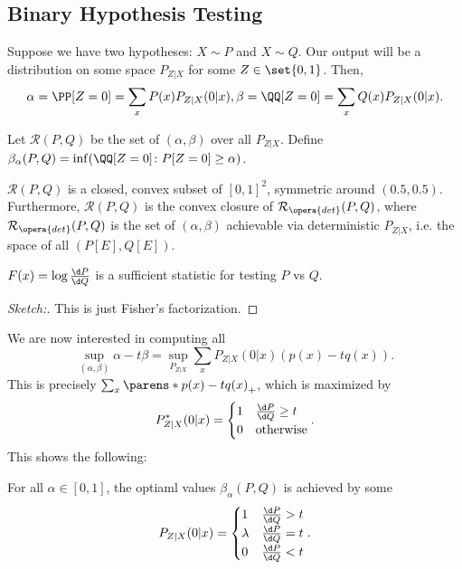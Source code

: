 \subsection{Binary Hypothesis Testing}

Suppose we have two hypotheses: $X\sim P$ and $X\sim Q$. Our output will be a distribution on some space $P_{Z|X}$ for some $Z\in \set{0,1}$.
Then, \[
	\alpha = \PP[Z=0] = \sum_x P(x) P_{Z|X}(0|x), \beta = \QQ[Z=0] = \sum_x Q(x) P_{Z|X}(0|x).
\]
\begin{defn}
	Let $\mathcal R(P,Q)$ be the set of $(\alpha, \beta)$ over all $P_{Z|X}$. Define $\beta_\alpha(P,Q) = \inf (\QQ[Z=0] \colon P[Z=0] \geq \alpha)$.
\end{defn}

\begin{fact}
	$\mathcal R(P,Q)$ is a closed, convex subset of $[0,1]^2$, symmetric around $(0.5, 0.5)$. Furthermore, $\mathcal R(P,Q)$ is the convex closure of $\mathcal R_{\opera{det}}(P,Q)$, where $\mathcal R_{\opera{det}}(P,Q)$ is the set of $(\alpha, \beta)$ achievable via deterministic $P_{Z|X}$, i.e. the space of all $(P[E], Q[E])$.
\end{fact}

\begin{thm}
	$F(x) = \log \frac{\d P}{\d Q}$ is a sufficient statistic for testing $P$ vs $Q$.
\end{thm}

\begin{proof}
	[Sketch:] This is just Fisher's factorization.
\end{proof}

We are now interested in computing all \[
	\sup_{(\alpha, \beta)} \alpha - t \beta = \sup_{P_{Z|X}} \sum_x P_{Z|X}(0|x) (p(x) - tq(x)).
\]
This is precisely $\sum_x \parens*{p(x) - tq(x)}_+$, which is maximized by \[
	P^*_{Z|X}(0|x) = \begin{cases} 1 & \frac{\d P}{\d Q} \geq t \\ 0 & \text{otherwise} \end{cases}.
\]
This shows the following:

\begin{thm}
	For all $\alpha\in [0,1]$, the optiaml values $\beta_\alpha(P,Q)$ is achieved by some \[
		P_{Z|X} (0|x) = \begin{cases} 1 & \frac{\d P}{\d Q} > t \\ \lambda & \frac{\d P}{\d Q} = t \\ 0 & \frac{\d P}{\d Q} < t\end{cases}.
	\]
\end{thm}

